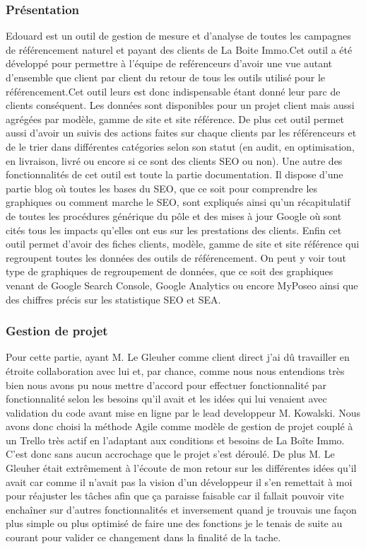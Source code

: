 \documentclass[12pt]{article}
\begin{document}
\subsubsection{Présentation}
Edouard est un outil de gestion de mesure et d’analyse de toutes les campagnes de référencement naturel et payant des clients de La Boite Immo.Cet outil a été développé pour permettre à l'équipe de reférenceurs d'avoir une vue autant d'ensemble que client par client du retour de tous les outils utilisé pour le référencement.Cet outil leurs est donc indispensable étant donné leur parc de clients conséquent. Les données sont disponibles pour un projet client mais aussi agrégées par modèle, gamme de site et site référence. De plus cet outil permet aussi d'avoir un suivis des actions faites sur chaque clients par les référenceurs et de le trier dans différentes catégories selon son statut (en audit, en optimisation, en livraison, livré ou encore si ce sont des clients SEO ou non). Une autre des fonctionnalités de cet outil est toute la partie documentation. Il dispose d'une partie blog où toutes les bases du SEO, que ce soit pour comprendre les graphiques ou comment marche le SEO, sont expliqués ainsi qu'un récapitulatif de toutes les procédures générique du pôle et des mises à jour Google où sont cités tous les impacts qu'elles ont eus sur les prestations des clients. Enfin cet outil permet d'avoir des fiches clients, modèle, gamme de site et site référence qui regroupent toutes les données des outils de référencement. On peut y voir tout type de graphiques de regroupement de données, que ce soit des graphiques venant de Google Search Console, Google Analytics ou encore MyPoseo ainsi que des chiffres précis sur les statistique SEO et SEA.  \\

\newpage
\subsubsection{Gestion de projet}

Pour cette partie, ayant M. Le Gleuher comme client direct j'ai dû travailler en étroite collaboration avec lui et, par chance, comme nous nous entendions très bien nous avons pu nous mettre d'accord pour effectuer fonctionnalité par fonctionnalité selon les besoins qu'il avait et les idées qui lui venaient avec validation du code avant mise en ligne par le lead developpeur M. Kowalski. Nous avons donc choisi la méthode Agile comme modèle de gestion de projet couplé à un Trello très actif en l'adaptant aux conditions et besoins de La Boîte Immo. C'est donc sans aucun accrochage que le projet s'est déroulé. De plus M. Le Gleuher était extrêmement à l'écoute de mon retour sur les différentes idées qu'il avait car comme il n'avait pas la vision d'un développeur il s'en remettait à moi pour réajuster les tâches afin que ça paraisse faisable car il fallait pouvoir vite enchaîner sur d'autres fonctionnalités et inversement quand je trouvais une façon plus simple ou plus optimisé de faire une des fonctions je le tenais de suite au courant pour valider ce changement dans la finalité de la tache. 
\end{document}
